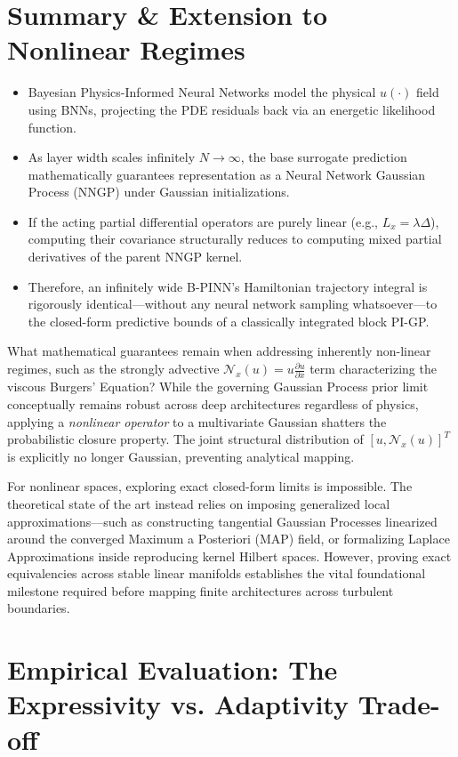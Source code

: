 \documentclass[11pt]{article}
\begin{document}
\section{Summary \& Extension to Nonlinear Regimes}
\begin{itemize}
\item Bayesian Physics-Informed Neural Networks model the physical $u(\cdot)$ field using BNNs, projecting the PDE residuals back via an energetic likelihood function.
\item As layer width scales infinitely $N \rightarrow \infty$, the base surrogate prediction mathematically guarantees representation as a Neural Network Gaussian Process (NNGP) under Gaussian initializations.
\item If the acting partial differential operators are purely linear (e.g., $L_x = \lambda \Delta$), computing their covariance structurally reduces to computing mixed partial derivatives of the parent NNGP kernel.
\item Therefore, an infinitely wide B-PINN's Hamiltonian trajectory integral is rigorously identical—without any neural network sampling whatsoever—to the closed-form predictive bounds of a classically integrated block PI-GP.
\end{itemize}

What mathematical guarantees remain when addressing inherently non-linear regimes, such as the strongly advective $\mathcal{N}_x(u) = u \frac{\partial u}{\partial x}$ term characterizing the viscous Burgers' Equation?
While the governing Gaussian Process prior limit conceptually remains robust across deep architectures regardless of physics, applying a \emph{nonlinear operator} to a multivariate Gaussian shatters the probabilistic closure property. The joint structural distribution of $[u, \mathcal{N}_x(u)]^T$ is explicitly no longer Gaussian, preventing analytical mapping.

For nonlinear spaces, exploring exact closed-form limits is impossible. The theoretical state of the art instead relies on imposing generalized local approximations—such as constructing tangential Gaussian Processes linearized around the converged Maximum a Posteriori (MAP) field, or formalizing Laplace Approximations inside reproducing kernel Hilbert spaces. However, proving exact equivalencies across stable linear manifolds establishes the vital foundational milestone required before mapping finite architectures across turbulent boundaries.
\section{Empirical Evaluation: The Expressivity vs. Adaptivity Trade-off}
\end{document}
